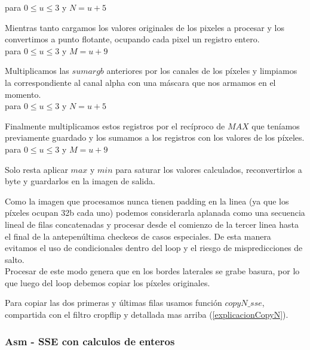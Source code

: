  
para $0 \le u \le 3$ y $N = u+5$

Mientras tanto cargamos los valores originales de los pixeles a procesar y los convertimos a punto flotante, ocupando cada pixel un registro entero. \\

 
para $0 \le u \le 3$ y $M = u+9$

Multiplicamos las $sumargb$ anteriores por los canales de los píxeles y limpiamos la correspondiente al canal alpha con una máscara que nos armamos en el momento. \\

 
para $0 \le u \le 3$ y $N = u+5$

Finalmente multiplicamos estos registros por el recíproco de $MAX$ que teníamos previamente guardado y los sumamos a los registros con los valores de los píxeles. \\

 
para $0 \le u \le 3$ y $M = u+9$

Solo resta aplicar $max$ y $min$ para saturar los valores calculados, reconvertirlos a byte y guardarlos en la imagen de salida.

\vspace{10 mm}

Como la imagen que procesamos nunca tienen padding en la linea (ya que los píxeles ocupan 32b cada uno) podemos considerarla aplanada como una secuencia lineal de filas concatenadas y procesar desde el comienzo de la tercer linea hasta el final de la antepenúltima checkeos de casos especiales.
De esta manera evitamos el uso de condicionales dentro del loop y el riesgo de mispredicciones de salto. \\
Procesar de este modo genera que en los bordes laterales se grabe basura, por lo que luego del loop debemos copiar los píxeles originales.

Para copiar las dos primeras y últimas filas usamos función $copyN\_sse$, compartida con el filtro cropflip y detallada mas arriba (\ref{explicacionCopyN}).

\subsubsection{Asm - SSE con calculos de enteros}

